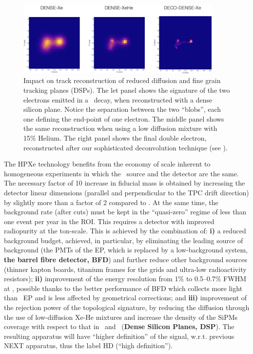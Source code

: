 \begin{figure}
  \begin{center}
      \includegraphics[width=0.91\textwidth]{img2/tracks.jpg}
    \caption{Impact on track reconstruction of reduced diffusion and fine grain tracking planes (DSPs). The let panel shows the signature of the two electrons emitted in a \bb\ decay, when reconstructed with a dense silicon plane. Notice the separation between the two ``blobs'', each one defining the end-point of one electron. The middle panel shows the same reconstruction when using a low diffusion mixture with 15\% Helium. The right panel shows the final double electron, reconstructed after our sophisticated deconvolution technique (see \cite{NEXT:2020jmz}).} 
    \label{fig.DSP}
  \end{center}
\end{figure}


 The HPXe technology benefits from the economy of scale inherent to homogeneous experiments in which the \bbonu\ source and the detector are the same. The necessary factor of 10 increase in fiducial mass is obtained by increasing the detector linear dimensions (parallel and perpendicular to the TPC drift direction) by slightly more than a factor of 2 compared to \NEXT. At the same time, the background rate (after cuts) must be kept in the ``quasi-zero'' regime of less than one event per year in the ROI. This requires a detector with improved radiopurity at the ton-scale. This is achieved by the combination of: {\bf i)} a reduced background budget, achieved, in particular, by eliminating the leading source of background (the PMTs of the EP, which is replaced by a low-background system, {\bf the barrel fibre detector, BFD}) and further reduce other background sources (thinner kapton boards, titanium frames for the grids and ultra-low radioactivity resistors);  {\bf ii)} improvement of the energy resolution from 1\% to 0.5--0.7\% FWHM at \Qbb, possible thanks to the better  performance of BFD which collects more light than \Next\ EP and is less affected by geometrical corrections; and {\bf iii)} improvement of the rejection power of the topological signature, by reducing the diffusion through the use of low-diffusion Xe-He mixtures and increase the density of the SiPMs coverage with respect to that in \NEW\ and \Next\ ({\bf Dense Silicon Planes, DSP}). The resulting apparatus will have ``higher definition'' of the signal, w.r.t. previous NEXT apparatus, thus the label HD (``high definition''). 
 

